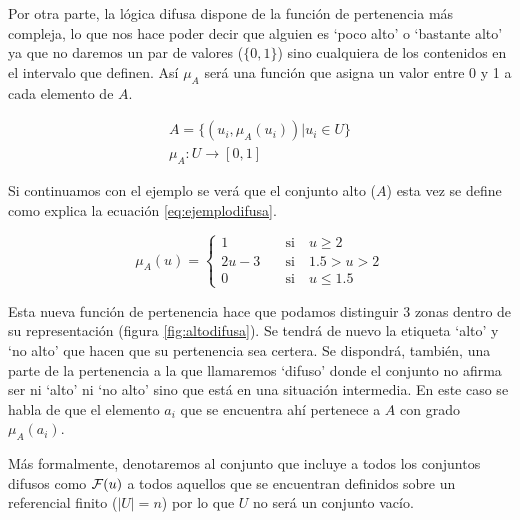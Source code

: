 \documentclass[main]{subfiles}
\begin{document}
%

Por otra parte, la lógica difusa dispone de la función de pertenencia más compleja, lo que nos hace poder decir que alguien es `poco alto' o `bastante alto' ya que no daremos un par de valores (${\{0,1\}}$) sino cualquiera de los contenidos en el intervalo que definen. Así ${\mu_{A}}$ será una función que asigna un valor entre 0 y 1 a cada elemento de $A$.

\begin{gather}\label{eq:logicadifusa} %
	A = \{(u_{i}, \mu_{A}(u_{i})) | u_{i}\in U\}\\
	\mu_{A}:U\rightarrow [0,1]
\end{gather}

Si continuamos con el ejemplo se verá que el conjunto alto ($A$) esta vez se define como explica la ecuación \ref{eq:ejemplodifusa}.

\begin{equation}\label{eq:ejemplodifusa}
	\mu_{A}(u) = \left\{
		\begin{aligned}
			1 \quad&\text{si}\quad u\geq 2\\
			2u - 3 \quad&\text{si}\quad 1.5>u>2\\
			0 \quad&\text{si}\quad u\leq 1.5
		\end{aligned}
	\right.
 \end{equation}

Esta nueva función de pertenencia hace que podamos distinguir 3 zonas dentro de su representación (figura \ref{fig:altodifusa}). Se tendrá de nuevo la etiqueta `alto' y `no alto' que hacen que su pertenencia sea certera. Se dispondrá, también, una parte de la pertenencia a la que llamaremos `difuso' donde el conjunto no afirma ser ni `alto' ni `no alto' sino que está en una situación intermedia. En este caso se habla de que el elemento $a_{i}$ que se encuentra ahí pertenece a $A$ con grado ${\mu_{A}(a_{i})}$.

%

Más formalmente, denotaremos al conjunto que incluye a todos los conjuntos difusos como $\mathcal{F}(u)$ a todos aquellos que se encuentran definidos sobre un referencial finito (${|U| = n}$) por lo que $U$ no será un conjunto vacío.
\end{document}
